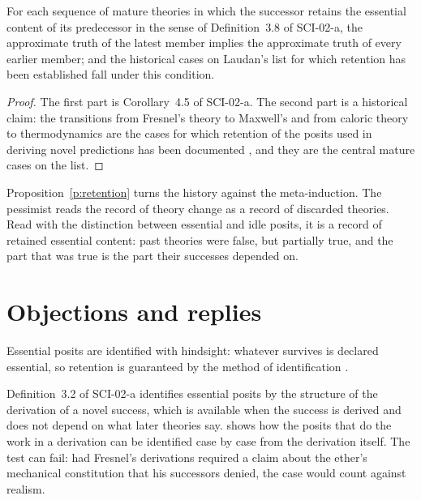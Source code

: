 \documentclass{situationist-preprint}
\begin{document}
\begin{proposition}\label{p:retention}
For each sequence of mature theories in which the successor retains the essential content of its predecessor in the sense of Definition~3.8 of SCI-02-a, the approximate truth of the latest member implies the approximate truth of every earlier member; and the historical cases on Laudan's list for which retention has been established fall under this condition.
\end{proposition}

\begin{proof}
The first part is Corollary~4.5 of SCI-02-a. The second part is a historical claim: the transitions from Fresnel's theory to Maxwell's and from caloric theory to thermodynamics are the cases for which retention of the posits used in deriving novel predictions has been documented \citep{Psillos1999}, and they are the central mature cases on the list.
\end{proof}

Proposition~\ref{p:retention} turns the history against the meta-induction. The pessimist reads the record of theory change as a record of discarded theories. Read with the distinction between essential and idle posits, it is a record of retained essential content: past theories were false, but partially true, and the part that was true is the part their successes depended on.

\section{Objections and replies}\label{s:objections}

\begin{objection}[Hindsight]
Essential posits are identified with hindsight: whatever survives is declared essential, so retention is guaranteed by the method of identification \citep{Stanford2006}.
\end{objection}

\begin{reply}
Definition~3.2 of SCI-02-a identifies essential posits by the structure of the derivation of a novel success, which is available when the success is derived and does not depend on what later theories say. \citet{Vickers2013} shows how the posits that do the work in a derivation can be identified case by case from the derivation itself. The test can fail: had Fresnel's derivations required a claim about the ether's mechanical constitution that his successors denied, the case would count against realism.
\end{reply}
\end{document}
